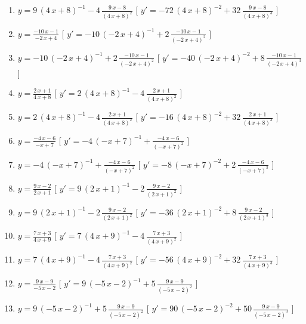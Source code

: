 \begin{esercizio}
\begin{enumerate}
\item $y= 9\, \left( 4\,x+8 \right) ^{-1}-4\,{\frac {9\,x-8}{ \left( 4\,x+8 \right) ^{2}}} $ \hfill [ $y'= -72\, \left( 4\,x+8 \right) ^{-2}+32\,{\frac {9\,x-8}{ \left( 4\,x+8 \right) ^{3}}}$ ]
\item $y= {\frac {-10\,x-1}{-2\,x+4}} $ \hfill [ $y'= -10\, \left( -2\,x+4 \right) ^{-1}+2\,{\frac {-10\,x-1}{ \left( -2\,x+4 \right) ^{2}}}$ ]
\item $y= -10\, \left( -2\,x+4 \right) ^{-1}+2\,{\frac {-10\,x-1}{ \left( -2\,x+4 \right) ^{2}}} $ \hfill [ $y'= -40\, \left( -2\,x+4 \right) ^{-2}+8\,{\frac {-10\,x-1}{ \left( -2\,x+4 \right) ^{3}}}$ ]
\item $y= {\frac {2\,x+1}{4\,x+8}} $ \hfill [ $y'= 2\, \left( 4\,x+8 \right) ^{-1}-4\,{\frac {2\,x+1}{ \left( 4\,x+8 \right) ^{2}}}$ ]
\item $y= 2\, \left( 4\,x+8 \right) ^{-1}-4\,{\frac {2\,x+1}{ \left( 4\,x+8 \right) ^{2}}} $ \hfill [ $y'= -16\, \left( 4\,x+8 \right) ^{-2}+32\,{\frac {2\,x+1}{ \left( 4\,x+8 \right) ^{3}}}$ ]
\item $y= {\frac {-4\,x-6}{-x+7}} $ \hfill [ $y'= -4\, \left( -x+7 \right) ^{-1}+{\frac {-4\,x-6}{ \left( -x+7 \right) ^{2}}}$ ]
\item $y= -4\, \left( -x+7 \right) ^{-1}+{\frac {-4\,x-6}{ \left( -x+7 \right) ^{2}}} $ \hfill [ $y'= -8\, \left( -x+7 \right) ^{-2}+2\,{\frac {-4\,x-6}{ \left( -x+7 \right) ^{3}}}$ ]
\item $y= {\frac {9\,x-2}{2\,x+1}} $ \hfill [ $y'= 9\, \left( 2\,x+1 \right) ^{-1}-2\,{\frac {9\,x-2}{ \left( 2\,x+1 \right) ^{2}}}$ ]
\item $y= 9\, \left( 2\,x+1 \right) ^{-1}-2\,{\frac {9\,x-2}{ \left( 2\,x+1 \right) ^{2}}} $ \hfill [ $y'= -36\, \left( 2\,x+1 \right) ^{-2}+8\,{\frac {9\,x-2}{ \left( 2\,x+1 \right) ^{3}}}$ ]
\item $y= {\frac {7\,x+3}{4\,x+9}} $ \hfill [ $y'= 7\, \left( 4\,x+9 \right) ^{-1}-4\,{\frac {7\,x+3}{ \left( 4\,x+9 \right) ^{2}}}$ ]
\item $y= 7\, \left( 4\,x+9 \right) ^{-1}-4\,{\frac {7\,x+3}{ \left( 4\,x+9 \right) ^{2}}} $ \hfill [ $y'= -56\, \left( 4\,x+9 \right) ^{-2}+32\,{\frac {7\,x+3}{ \left( 4\,x+9 \right) ^{3}}}$ ]
\item $y= {\frac {9\,x-9}{-5\,x-2}} $ \hfill [ $y'= 9\, \left( -5\,x-2 \right) ^{-1}+5\,{\frac {9\,x-9}{ \left( -5\,x-2 \right) ^{2}}}$ ]
\item $y= 9\, \left( -5\,x-2 \right) ^{-1}+5\,{\frac {9\,x-9}{ \left( -5\,x-2 \right) ^{2}}} $ \hfill [ $y'= 90\, \left( -5\,x-2 \right) ^{-2}+50\,{\frac {9\,x-9}{ \left( -5\,x-2 \right) ^{3}}}$ ]

\end{enumerate}
\end{esercizio}
